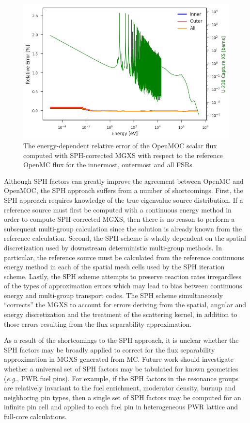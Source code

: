 \begin{figure}[h!]
\centering
\includegraphics[width=\linewidth]{figures/rel-err-inner-outer-sph}
\caption{The energy-dependent relative error of the OpenMOC scalar flux computed with SPH-corrected MGXS with respect to the reference OpenMC flux for the innermost, outermost and all FSRs.}
\label{fig:rel-err-energy-sph}
\end{figure}

Although SPH factors can greatly improve the agreement between OpenMC and OpenMOC, the SPH approach suffers from a number of shortcomings. First, the SPH approach requires knowledge of the true eigenvalue source distribution. If a reference source must first be computed with a continuous energy method in order to compute SPH-corrected MGXS, then there is no reason to perform a subsequent multi-group calculation since the solution is already known from the reference calculation. Second, the SPH scheme is wholly dependent on the spatial discretization used by downstream deterministic multi-group methods. In particular, the reference source must be calculated from the reference continuous energy method in each of the spatial mesh cells used by the SPH iteration scheme. Lastly, the SPH scheme attempts to preserve reaction rates irregardless of the types of approximation errors which may lead to bias between continuous energy and multi-group transport codes. The SPH scheme simultaneously ``corrects'' the MGXS to account for errors deriving from the spatial, angular and energy discretization and the treatment of the scattering kernel, in addition to those errors resulting from the flux separability approximation.

As a result of the shortcomings to the SPH approach, it is unclear whether the SPH factors may be broadly applied to correct for the flux separability approximation in MGXS generated from MC. Future work should investigate whether a universal set of SPH factors may be tabulated for known geometries (\textit{e.g.}, PWR fuel pins). For example, if the SPH factors in the resonance groups are relatively invariant to the fuel enrichment, moderator density, burnup  and neighboring pin types, then a single set of SPH factors may be computed for an infinite pin cell and applied to each fuel pin in heterogeneous PWR lattice and full-core calculations.

